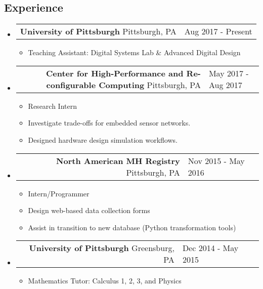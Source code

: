\documentclass[18pt]{article}
\makeatletter
\providecommand{\tightlist}{
    \setlength{\itemsep}{0pt}\setlength{\parskip}{0pt}
}
\providecommand{\datetable}[2]{
    \begin{tabular*}{\textwidth}{@{}r @{\extracolsep{\fill}} l}
        #1 & #2
    \end{tabular*}
}
\makeatother
\begin{document}
      
    \subsection*{Experience}\label{experience}
        \begin{itemize}[label={}]
        \item \datetable{
            \textbf{University of Pittsburgh} \textbar{} Pittsburgh, PA
        }{Aug 2017 - Present}
        \begin{itemize}[topsep=0pt]
            \item Teaching Assistant: Digital Systems Lab \& Advanced Digital Design
        \end{itemize}
    
        \item \datetable{
            \textbf{Center for High-Performance and Re-configurable Computing} \textbar{} Pittsburgh, PA
        }{May 2017 - Aug 2017}
        \begin{itemize}[topsep=0pt]\tightlist
          \item Research Intern
          \item Investigate trade-offs for embedded sensor networks.
          \item Designed hardware design simulation workflows.
      	\end{itemize}
      
        \item \datetable{
            \textbf{North American MH Registry} 
            \textbar{} Pittsburgh, PA
        }{Nov 2015 - May 2016}
        \begin{itemize}[topsep=0pt]\tightlist
          \item Intern/Programmer
          \item Design web-based data collection forms
          \item Assist in transition to new database (Python transformation tools)
        \end{itemize}

        \item \datetable{
            \textbf{University of Pittsburgh} \textbar{} 
            Greensburg, PA
        }{Dec 2014 - May 2015}
        \begin{itemize}[topsep=0pt]
            \item Mathematics Tutor: Calculus 1, 2, 3, and Physics
        \end{itemize}
        \end{itemize}
      
\end{document}
